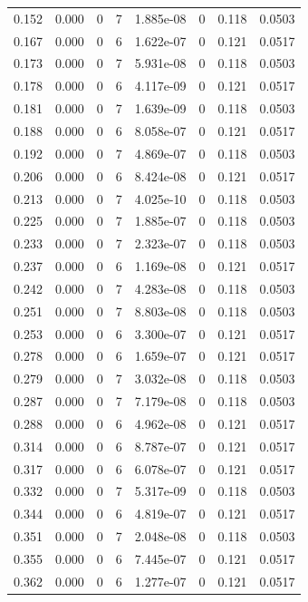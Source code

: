 \documentclass[preview]{standalone}
\begin{document}
{{\begin{tabular}{L{1.2cm}C{1.2cm} C{0.3cm}C{0.5cm} C{1.4cm}C{1.4cm} C{1.4cm}C{1.4cm}}
  0.152  &  0.000  & 0     &  7 &  1.885e-08  & 0  & 0.118 &  0.0503   \\ 
  0.167  &  0.000  & 0     &  6 &  1.622e-07  & 0  & 0.121 &  0.0517   \\ 
  0.173  &  0.000  & 0     &  7 &  5.931e-08  & 0  & 0.118 &  0.0503   \\ 
  0.178  &  0.000  & 0     &  6 &  4.117e-09  & 0  & 0.121 &  0.0517   \\ 
  0.181  &  0.000  & 0     &  7 &  1.639e-09  & 0  & 0.118 &  0.0503   \\ 
  0.188  &  0.000  & 0     &  6 &  8.058e-07  & 0  & 0.121 &  0.0517   \\ 
  0.192  &  0.000  & 0     &  7 &  4.869e-07  & 0  & 0.118 &  0.0503   \\ 
  0.206  &  0.000  & 0     &  6 &  8.424e-08  & 0  & 0.121 &  0.0517   \\ 
  0.213  &  0.000  & 0     &  7 &  4.025e-10  & 0  & 0.118 &  0.0503   \\ 
  0.225  &  0.000  & 0     &  7 &  1.885e-07  & 0  & 0.118 &  0.0503   \\ 
  0.233  &  0.000  & 0     &  7 &  2.323e-07  & 0  & 0.118 &  0.0503   \\ 
  0.237  &  0.000  & 0     &  6 &  1.169e-08  & 0  & 0.121 &  0.0517   \\ 
  0.242  &  0.000  & 0     &  7 &  4.283e-08  & 0  & 0.118 &  0.0503   \\ 
  0.251  &  0.000  & 0     &  7 &  8.803e-08  & 0  & 0.118 &  0.0503   \\ 
  0.253  &  0.000  & 0     &  6 &  3.300e-07  & 0  & 0.121 &  0.0517   \\ 
  0.278  &  0.000  & 0     &  6 &  1.659e-07  & 0  & 0.121 &  0.0517   \\ 
  0.279  &  0.000  & 0     &  7 &  3.032e-08  & 0  & 0.118 &  0.0503   \\ 
  0.287  &  0.000  & 0     &  7 &  7.179e-08  & 0  & 0.118 &  0.0503   \\ 
  0.288  &  0.000  & 0     &  6 &  4.962e-08  & 0  & 0.121 &  0.0517   \\ 
  0.314  &  0.000  & 0     &  6 &  8.787e-07  & 0  & 0.121 &  0.0517   \\ 
  0.317  &  0.000  & 0     &  6 &  6.078e-07  & 0  & 0.121 &  0.0517   \\ 
  0.332  &  0.000  & 0     &  7 &  5.317e-09  & 0  & 0.118 &  0.0503   \\ 
  0.344  &  0.000  & 0     &  6 &  4.819e-07  & 0  & 0.121 &  0.0517   \\ 
  0.351  &  0.000  & 0     &  7 &  2.048e-08  & 0  & 0.118 &  0.0503   \\ 
  0.355  &  0.000  & 0     &  6 &  7.445e-07  & 0  & 0.121 &  0.0517   \\ 
  0.362  &  0.000  & 0     &  6 &  1.277e-07  & 0  & 0.121 &  0.0517   \\ 
\hline 
\end{tabular} 

}}
\end{document}
